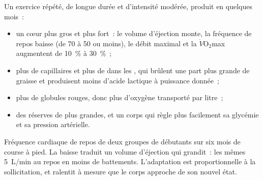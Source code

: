 \begin{proposition}\label{prop:g10:sport-and-health:endurance}
Un exercice répété, de longue durée et d'intensité modérée, produit en
quelques mois~:
\begin{itemize}
  \item un cœur plus gros et plus fort~: le volume d'éjection monte, la
        fréquence de repos baisse (de 70 à 50 ou moins), le débit
        maximal et la $\dot V\!\mathrm{O_2}$max augmentent de 10~\% à
        30~\%~;
  \item plus de capillaires et plus de  dans les , qui brûlent une part plus grande de graisse et
        produisent moins d'acide lactique à puissance donnée~;
  \item plus de globules rouges, donc plus d'oxygène transporté par
        litre~;
  \item des réserves de  plus grandes, et un corps qui règle
        plus facilement sa glycémie et sa pression artérielle.
\end{itemize}
\end{proposition}
\admitted

\begin{omfigure}

{\small Fréquence cardiaque de repos de deux groupes de débutants sur
six mois de course à pied. La baisse traduit un volume d'éjection qui
grandit~: les mêmes \qty{5}{L/min} au repos en moins de battements.
L'adaptation est proportionnelle à la sollicitation, et ralentit à
mesure que le corps approche de son nouvel état.}
\end{omfigure}

